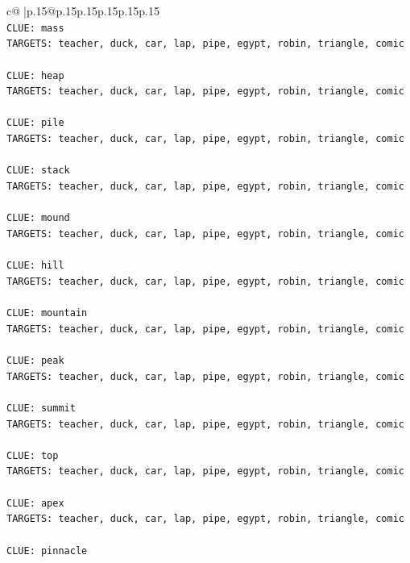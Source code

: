 \documentclass{article}
\begin{document}
{\begin{supertabular}{c@{$\;$}|p{.15\linewidth}@{}p{.15\linewidth}p{.15\linewidth}p{.15\linewidth}p{.15\linewidth}p{.15\linewidth}}
{{{\\ 
\texttt{CLUE: mass} \\
\texttt{TARGETS: teacher, duck, car, lap, pipe, egypt, robin, triangle, comic} \\
\\ 
\texttt{CLUE: heap} \\
\texttt{TARGETS: teacher, duck, car, lap, pipe, egypt, robin, triangle, comic} \\
\\ 
\texttt{CLUE: pile} \\
\texttt{TARGETS: teacher, duck, car, lap, pipe, egypt, robin, triangle, comic} \\
\\ 
\texttt{CLUE: stack} \\
\texttt{TARGETS: teacher, duck, car, lap, pipe, egypt, robin, triangle, comic} \\
\\ 
\texttt{CLUE: mound} \\
\texttt{TARGETS: teacher, duck, car, lap, pipe, egypt, robin, triangle, comic} \\
\\ 
\texttt{CLUE: hill} \\
\texttt{TARGETS: teacher, duck, car, lap, pipe, egypt, robin, triangle, comic} \\
\\ 
\texttt{CLUE: mountain} \\
\texttt{TARGETS: teacher, duck, car, lap, pipe, egypt, robin, triangle, comic} \\
\\ 
\texttt{CLUE: peak} \\
\texttt{TARGETS: teacher, duck, car, lap, pipe, egypt, robin, triangle, comic} \\
\\ 
\texttt{CLUE: summit} \\
\texttt{TARGETS: teacher, duck, car, lap, pipe, egypt, robin, triangle, comic} \\
\\ 
\texttt{CLUE: top} \\
\texttt{TARGETS: teacher, duck, car, lap, pipe, egypt, robin, triangle, comic} \\
\\ 
\texttt{CLUE: apex} \\
\texttt{TARGETS: teacher, duck, car, lap, pipe, egypt, robin, triangle, comic} \\
\\ 
\texttt{CLUE: pinnacle} \\
}}}
\end{supertabular}}
\end{document}
